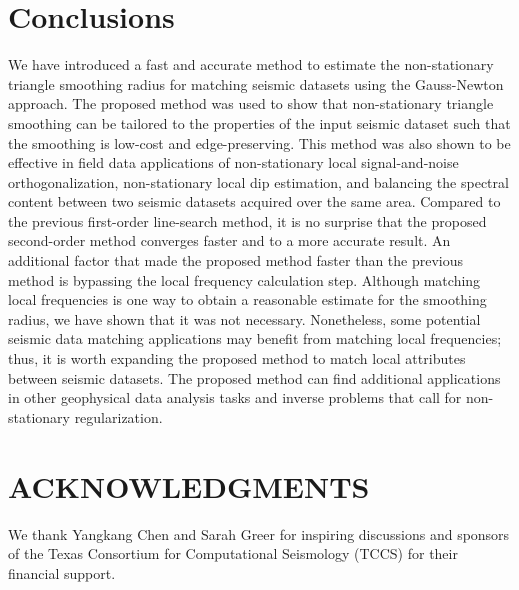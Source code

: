 



\section{Conclusions}
We have introduced a fast and accurate method to estimate the non-stationary triangle smoothing radius for matching seismic datasets using the Gauss-Newton approach. The proposed method was used to show that non-stationary triangle smoothing can be tailored to the properties of the input seismic dataset such that the smoothing is low-cost and edge-preserving. This method was also shown to be effective in field data applications of non-stationary local signal-and-noise orthogonalization, non-stationary local dip estimation, and balancing the spectral content between two seismic datasets acquired over the same area. Compared to the previous first-order line-search method, it is no surprise that the proposed second-order method converges faster and to a more accurate result. 
An additional factor that made the proposed method faster than the previous method is bypassing the local frequency calculation step. 
Although matching local frequencies is one way to obtain a reasonable estimate for the smoothing radius, we have shown that it was not necessary. 
Nonetheless, some potential seismic data matching applications may benefit from matching local frequencies; thus, it is worth expanding the proposed method to match local attributes between seismic datasets. 
The proposed method can find additional applications in other geophysical data analysis tasks and inverse problems that call for non-stationary regularization. 


\section{ACKNOWLEDGMENTS}
We thank Yangkang Chen and Sarah Greer for inspiring discussions and sponsors of the Texas Consortium for Computational Seismology (TCCS) for their financial support.



 



